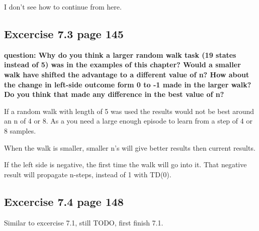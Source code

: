 I don't see how to continue from here. 

\subsection{Excercise 7.3 page 145}
\textbf{question: Why do you think a larger random walk task (19 states instead of 5) was in the examples of this chapter? Would a smaller walk have shifted the advantage to a different value of n? How about the change in left-side outcome form 0 to -1 made in the larger walk? Do you think that made any difference in the best value of n?}

If a random walk with length of 5 was used the results would not be best around an n of 4 or 8. As a you need a large enough episode to learn from a step of 4 or 8 samples.

When the walk is smaller, smaller n's will give better results then current results. 

If the left side is negative, the first time the walk will go into it. That negative result will propagate n-steps, instead of 1 with TD(0).

\subsection{Excercise 7.4 page 148}
Similar to excercise 7.1, still TODO, first finish 7.1.

